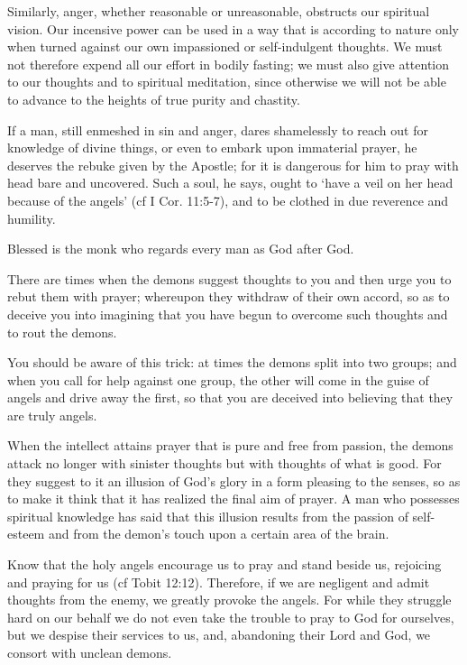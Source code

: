 \begin{quotationx}
Similarly, anger, whether reasonable or unreasonable, obstructs our spiritual vision. Our incensive power can be used in a way that is according to nature only when turned against our own impassioned or self-indulgent thoughts. We must not therefore expend all our effort in bodily fasting; we must also give attention to our thoughts and to spiritual meditation, since otherwise we will not be able to advance to the heights of true purity and chastity.

If a man, still enmeshed in sin and anger, dares shamelessly to reach out for knowledge of divine things, or even to embark upon immaterial prayer, he deserves the rebuke given by the Apostle; for it is dangerous for him to pray with head bare and uncovered. Such a soul, he says, ought to `have a veil on her head because of the angels' (cf I Cor. 11:5-7), and to be clothed in due reverence and humility.

Blessed is the monk who regards every man as God after God.

There are times when the demons suggest thoughts to you and then urge you to rebut them with prayer; whereupon they withdraw of their own accord, so as to deceive you into imagining that you have begun to overcome such thoughts and to rout the demons.

You should be aware of this trick: at times the demons split into two groups; and when you call for help against one group, the other will come in the guise of angels and drive away the first, so that you are deceived into believing that they are truly angels.

When the intellect attains prayer that is pure and free from passion, the demons attack no longer with sinister thoughts but with thoughts of what is good. For they suggest to it an illusion of God's glory in a form pleasing to the senses, so as to make it think that it has realized the final aim of prayer. A man who possesses spiritual knowledge has said that this illusion results from the passion of self-esteem and from the demon's touch upon a certain area of the brain.

Know that the holy angels encourage us to pray and stand beside us, rejoicing and praying for us (cf Tobit 12:12). Therefore, if we are negligent and admit thoughts from the enemy, we greatly provoke the angels. For while they struggle hard on our behalf we do not even take the trouble to pray to God for ourselves, but we despise their services to us, and, abandoning their Lord and God, we consort with unclean demons.


\end{quotationx}
